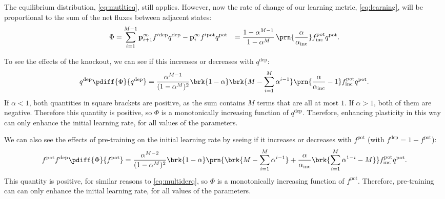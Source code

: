\documentclass[10pt]{article}
\newcommand{\pr}{\mathbf{p}}
\newcommand{\eq}{\pr^\infty}
\newcommand{\pot}{^{\text{pot}}}
\newcommand{\dep}{^{\text{dep}}}
\newcommand{\inc}{_{\text{inc}}}
\begin{document}
The equilibrium distribution, \eqref{eq:mutltieq}, still applies.
However, now the rate of change of our learning metric, \eqref{eq:learning}, will be proportional to the sum of the net fluxes between adjacent states:
%
\begin{equation}\label{eq:multiLinFlux}
  \begin{aligned}
    \Phi &= \sum_{i=1}^{M-1} \eq_{i+1} f'{}\dep q\dep - \eq_i f'{}\pot q\pot
         &= \frac{1-\alpha^{M-1}}{1-\alpha^M} \, \prn{\frac{\alpha}{\alpha\inc}} f\inc\pot q\pot.
  \end{aligned}
\end{equation}
%

To see the effects of the knockout, we can see if this increases or decreases with $q\dep$:
%
\begin{equation}\label{eq:multiderq}
  q\dep \pdiff{\Phi}{q\dep} =
    \frac{\alpha^{M - 1}}{(1 - \alpha^M)^2}
    \brk{1 - \alpha}
    \brk{M - \sum_{i=1}^M \alpha^{i-1}}
    \prn{\frac{\alpha}{\alpha\inc} - 1} f\inc\pot  q\pot.
\end{equation}
%
If $\alpha < 1$, both quantities in square brackets are positive, as the sum contains $M$ terms that are all at most $1$.
If $\alpha > 1$, both of them are negative.
Therefore this quantity is positive, so $\Phi$ is a monotonically increasing function of $q\dep$.
Therefore, enhancing plasticity in this way can only enhance the initial learning rate, for all values of the parameters.

We can also see the effects of pre-training on the initial learning rate by seeing if it increases or decreases with $f\pot$ (with $f\dep = 1 - f\pot$):
%
\begin{equation}\label{eq:multiderf}
  f\pot f\dep \pdiff{\Phi}{f\pot} =
    \frac{\alpha^{M - 2}}{(1 - \alpha^M)^2}
      \brk{1 - \alpha}
      \prn{\brk{M - \sum_{i=1}^M \alpha^{i-1}}
      + \frac{\alpha}{\alpha\inc} \brk{\sum_{i=1}^M \alpha^{1-i} - M}}
      f\inc\pot  q\pot.
\end{equation}
%
This quantity is positive, for similar reasons to \eqref{eq:multiderq}, so $\Phi$ is a monotonically increasing function of $f\pot$.
Therefore, pre-training can can only enhance the initial learning rate, for all values of the parameters.
\end{document}

